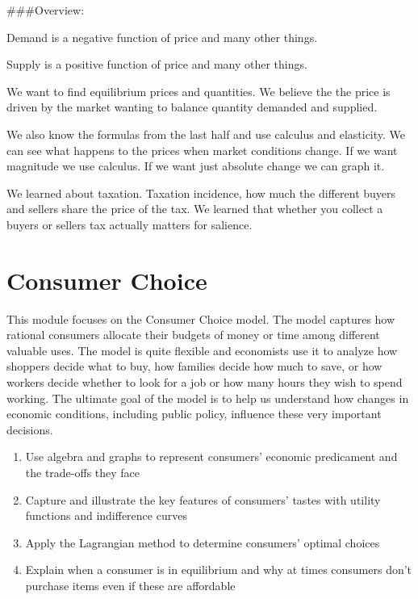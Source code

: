 \documentclass[
]{book}
\providecommand{\tightlist}{%
  \setlength{\itemsep}{0pt}\setlength{\parskip}{0pt}}
\begin{document}
\#\#\#Overview:

Demand is a negative function of price and many other things.

Supply is a positive function of price and many other things.

We want to find equilibrium prices and quantities. We believe the the price is driven by the market wanting to balance quantity demanded and supplied.

We also know the formulas from the last half and use calculus and elasticity. We can see what happens to the prices when market conditions change. If we want magnitude we use calculus. If we want just absolute change we can graph it.

We learned about taxation. Taxation incidence, how much the different buyers and sellers share the price of the tax. We learned that whether you collect a buyers or sellers tax actually matters for salience.

\hypertarget{consumer-choice}{%
\chapter{Consumer Choice}\label{consumer-choice}}

This module focuses on the Consumer Choice model. The model captures how rational consumers allocate their budgets of money or time among different valuable uses. The model is quite flexible and economists use it to analyze how shoppers decide what to buy, how families decide how much to save, or how workers decide whether to look for a job or how many hours they wish to spend working. The ultimate goal of the model is to help us understand how changes in economic conditions, including public policy, influence these very important decisions.

\begin{enumerate}
\def\labelenumi{\arabic{enumi}.}
\tightlist
\item
  Use algebra and graphs to represent consumers' economic predicament and the trade-offs they face
\item
  Capture and illustrate the key features of consumers' tastes with utility functions and indifference curves
\item
  Apply the Lagrangian method to determine consumers' optimal choices
\item
  Explain when a consumer is in equilibrium and why at times consumers don't purchase items even if these are affordable
\end{enumerate}
\end{document}

